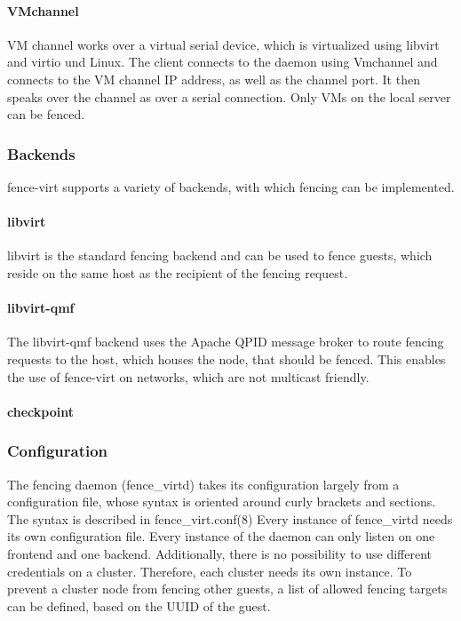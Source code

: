 \paragraph{VMchannel}
VM channel works over a virtual serial device, which is virtualized using libvirt and
virtio und Linux.
The client connects to the daemon using Vmchannel and connects to the VM channel IP address,
as well as the channel port. It then speaks over the channel as over a serial connection.
Only \acp{VM} on the local server can be fenced.
\subsubsection{Backends}
fence-virt supports a variety of backends, with which fencing can be implemented.
\paragraph{libvirt}
libvirt is the standard fencing backend and can be used to fence guests, which
reside on the same host as the recipient of the fencing request.
\paragraph{libvirt-qmf}
The libvirt-qmf backend uses the Apache QPID message broker to route fencing
requests to the host, which houses the node, that should be fenced. This
enables the use of fence-virt on networks, which are not multicast friendly.
\paragraph{checkpoint}
\subsubsection{Configuration}
The fencing daemon (fence\_virtd) takes its configuration largely from
a configuration file, whose syntax is oriented around curly brackets and 
sections. The syntax is described in fence\_virt.conf(8)
Every instance of fence_virtd needs its own configuration file.
Every instance of the daemon can only listen on one frontend and one backend.
Additionally, there is no possibility to use different credentials on a cluster.
Therefore, each cluster needs its own instance.
To prevent a cluster node from fencing other guests, a list of allowed fencing targets
can be defined, based on the UUID of the guest.

